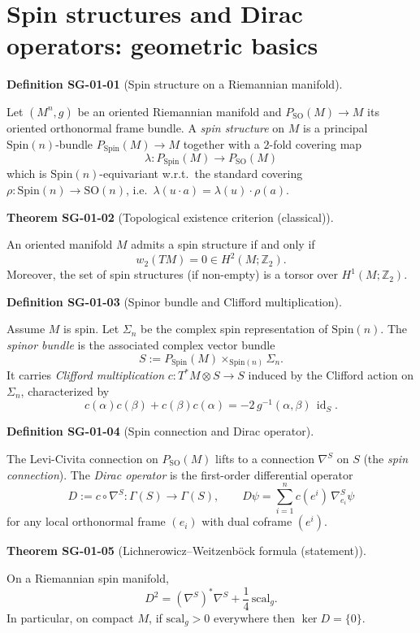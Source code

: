 \documentclass[10pt, letterpaper]{article}
\newcommand{\id}{\operatorname{id}}
\newcommand{\Z}{\mathbb{Z}}
\newcommand{\SO}{\mathrm{SO}}
\newcommand{\Spin}{\mathrm{Spin}}
\newcommand{\CustomHeading}[3]{%
  \par\medskip\noindent%
  \textbf{#1 #2} \textnormal{(#3)}.\enskip%
}
\newenvironment{DEF}[2]{\begin{unitbox}\CustomHeading{Definition}{#1}{#2}}{\end{unitbox}}
\newenvironment{THEO}[2]{\begin{unitbox}\CustomHeading{Theorem}{#1}{#2}}{\end{unitbox}}
\begin{document}
\section{Spin structures and Dirac operators: geometric basics}

\begin{DEF}{SG-01-01}{Spin structure on a Riemannian manifold}
Let $(M^n,g)$ be an oriented Riemannian manifold and $P_{\SO}(M)\to M$ its oriented orthonormal frame bundle.
A \emph{spin structure} on $M$ is a principal $\Spin(n)$-bundle $P_{\Spin}(M)\to M$ together with a $2$-fold covering map
\[
\lambda:P_{\Spin}(M)\longrightarrow P_{\SO}(M)
\]
which is $\Spin(n)$-equivariant w.r.t.\ the standard covering $\rho:\Spin(n)\to \SO(n)$, i.e.\ $\lambda(u\cdot a)=\lambda(u)\cdot \rho(a)$.
\end{DEF}

\begin{THEO}{SG-01-02}{Topological existence criterion (classical)}
An oriented manifold $M$ admits a spin structure if and only if
\[
w_2(TM)=0 \in H^2(M;\Z_2).
\]
Moreover, the set of spin structures (if non-empty) is a torsor over $H^1(M;\Z_2)$.
\end{THEO}

\begin{DEF}{SG-01-03}{Spinor bundle and Clifford multiplication}
Assume $M$ is spin. Let $\Sigma_n$ be the complex spin representation of $\Spin(n)$.
The \emph{spinor bundle} is the associated complex vector bundle
\[
S:=P_{\Spin}(M)\times_{\Spin(n)} \Sigma_n.
\]
It carries \emph{Clifford multiplication} $c:T^*M\otimes S\to S$ induced by the Clifford action on $\Sigma_n$, characterized by
\[
c(\alpha)c(\beta)+c(\beta)c(\alpha)=-2\,g^{-1}(\alpha,\beta)\,\id_S.
\]
\end{DEF}

\begin{DEF}{SG-01-04}{Spin connection and Dirac operator}
The Levi-Civita connection on $P_{\SO}(M)$ lifts to a connection $\nabla^S$ on $S$ (the \emph{spin connection}).
The \emph{Dirac operator} is the first-order differential operator
\[
D := c\circ \nabla^S:\Gamma(S)\longrightarrow \Gamma(S),
\qquad
D\psi=\sum_{i=1}^n c(e^i)\,\nabla^S_{e_i}\psi
\]
for any local orthonormal frame $(e_i)$ with dual coframe $(e^i)$.
\end{DEF}

\begin{THEO}{SG-01-05}{Lichnerowicz--Weitzenb\"ock formula (statement)}
On a Riemannian spin manifold,
\[
D^2 = (\nabla^S)^*\nabla^S + \frac{1}{4}\,\mathrm{scal}_g.
\]
In particular, on compact $M$, if $\mathrm{scal}_g>0$ everywhere then $\ker D=\{0\}$.
\end{THEO}
\end{document}
